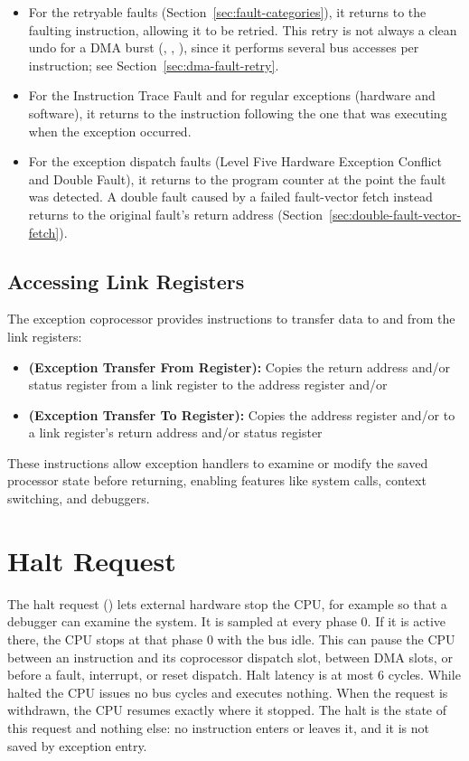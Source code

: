 \begin{itemize}
	\item For the retryable faults (Section~\ref{sec:fault-categories}), it returns to the faulting instruction, allowing it to
	      be retried. This retry is not always a clean undo for a DMA burst (, , ),
	      since it performs several bus accesses per instruction; see Section~\ref{sec:dma-fault-retry}.
	\item For the Instruction Trace Fault and for regular exceptions (hardware and software), it returns to the instruction
	      following the one that was executing when the exception occurred.
	\item For the exception dispatch faults (Level Five Hardware Exception Conflict and Double Fault), it returns to the program
	      counter at the point the fault was detected. A double fault caused by a failed fault-vector fetch instead returns to
	      the original fault's return address (Section~\ref{sec:double-fault-vector-fetch}).
\end{itemize}

\subsection{Accessing Link Registers}

The exception coprocessor provides instructions to transfer data to and from the link registers:

\begin{itemize}
	\item \textbf{ (Exception Transfer From Register):} Copies the return address and/or status register from a link register to the address register and/or 
	\item \textbf{ (Exception Transfer To Register):} Copies the address register and/or  to a link register's return address and/or status register
\end{itemize}

These instructions allow exception handlers to examine or modify the saved processor state before returning, enabling
features like system calls, context switching, and debuggers.

\section{Halt Request}
\label{sec:halt-request}

The halt request () lets external hardware stop the CPU, for example so that a debugger can examine the
system. It is sampled at every phase 0. If it is active there, the CPU stops at that phase 0 with the bus idle. This
can pause the CPU between an instruction and its coprocessor dispatch slot, between DMA slots, or before a fault,
interrupt, or reset dispatch. Halt latency is at most 6 cycles. While halted the CPU issues no bus cycles and executes
nothing. When the request is withdrawn, the CPU resumes exactly where it stopped. The halt is the state of this request
and nothing else: no instruction enters or leaves it, and it is not saved by exception entry.

